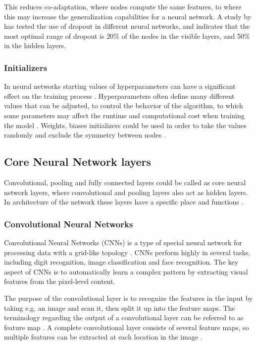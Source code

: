 \noindent
This reduces co-adaptation, where nodes compute the same features, to where this may increase the generalization capabilities for a neural network. 
A study by \citeauthor{Srivastava2014} \citep{Srivastava2014} has tested the use of dropout in different neural networks, and indicates that the most optimal range of dropout is 20\% of the nodes in the visible layers, and 50\% in the hidden layers.\citep{Srivastava2014}

\subsubsection{Initializers}
In neural networks starting values of hyperparameters can have a significant effect on the training process \citep{Bengio2012}. Hyperparameters often define many different values that can be adjusted, to control the behavior of the algorithm, to which some parameters may affect the runtime and computational cost when training the model \citep{Goodfellow2016}. Weights, biases initializers could be used in order to take the values randomly and exclude the symmetry between nodes \citep{Gustafson1998}. 

\subsection{Core Neural Network layers}\label{sec:Layers}
Convolutional, pooling and fully connected layers could be called as core neural network layers, where convolutional and pooling layers also act as hidden layers. In architecture of the network these layers have a specific place and functions \citep{LeCun2015,Goodfellow2016}.

\subsubsection{Convolutional Neural Networks}
Convolutional Neural Networks (CNNs) is a type of special neural network for processing data with a grid-like topology \citep{Goodfellow2016}. CNNs perform highly in several tasks, including digit recognition, image classification and face recognition. The key aspect of CNNs is to automatically learn a complex pattern by extracting visual features from the pixel-level content.\citep{Acquarelli2017,LeCun1998}

\noindent
The purpose of the convolutional layer is to recognize the features in the input by taking e.g. an image and scan it, then split it up into the feature maps. The terminology regarding the output of a convolutional layer can be referred to as feature map \citep{Goodfellow2016,LeCun1998}. A complete convolutional layer consists of several feature maps, so multiple features can be extracted at each location in the image \citep{LeCun1998}. 



